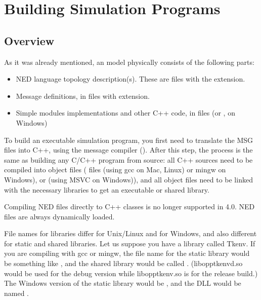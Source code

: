 \chapter{Building Simulation Programs}
\label{cha:building-simulation-programs}

\section{Overview}

As it was already mentioned, an {\opp} model physically consists of
the following parts:

\begin{itemize}
  \item{NED language topology description(s). These
      are files with the  extension.}
  \item{Message definitions, in files
      with  extension.}
  \item{Simple modules implementations and other C++ code, in 
        files (or , on Windows)}
\end{itemize}


To build an executable simulation program,
you first need to translate the MSG files
into C++, using the message compiler ().
After this step, the process is the same as building any C/C++
program from source: all C++ sources need to be compiled into object files
( files (using gcc on Mac, Linux) or mingw on Windows), or  (using MSVC on Windows)),
and all object files need to be linked with the necessary libraries to get
an executable or shared library.

\begin{note}
Compiling NED files directly to C++ classes is no longer supported in
{\opp} 4.0. NED files are always dynamically loaded.
\end{note}

File names for libraries differ for Unix/Linux and for Windows,
and also different for static and shared libraries.
Let us suppose you have a library called Tkenv.
If you are compiling with gcc or mingw, the file name for the static library
would be something like ,
and the shared library would be called .
(libopptkenvd.so would be used for the debug version while libopptkenv.so
is for the release build.) The Windows version of the static library would
be , and the DLL would be named .


